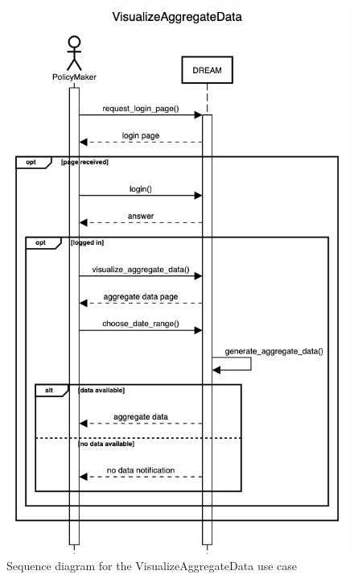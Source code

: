 \documentclass{article}
\begin{document}
\begin{figure}[h]
    \centering
	\includegraphics[scale=0.5]{sequence_diagrams/VisualizeAggregateData}
    \caption{Sequence diagram for the VisualizeAggregateData use case}
\end{figure}
\end{document}

